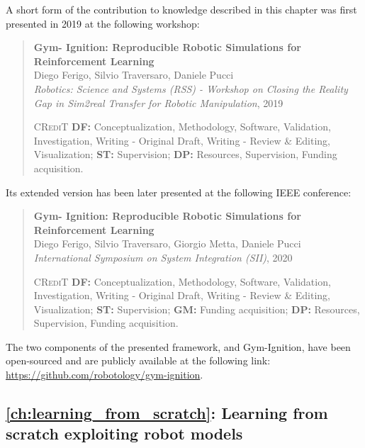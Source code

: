 A short form of the contribution to knowledge described in this chapter was first presented in 2019 at the following workshop:
%
\begin{quote}
    \textbf{Gym-
Ignition: Reproducible Robotic Simulations for Reinforcement
Learning} \\
    Diego Ferigo, Silvio Traversaro, Daniele Pucci \\
    \textit{Robotics: Science and Systems (RSS) - Workshop on
Closing the Reality Gap in Sim2real Transfer for Robotic Manipulation}, 2019

    \vspace{1mm}
    \textsc{CRediT} \hspace{2mm}
    \textbf{DF:} Conceptualization, Methodology, Software, Validation, Investigation, Writing - Original Draft, Writing - Review \& Editing, Visualization;
    \textbf{ST:} Supervision;
    \textbf{DP:} Resources, Supervision, Funding acquisition.
\end{quote}

\noindent
Its extended version has been later presented at the following IEEE conference:
%
\begin{quote}
    \textbf{Gym-
Ignition: Reproducible Robotic Simulations for Reinforcement
Learning} \\
    Diego Ferigo, Silvio Traversaro, Giorgio Metta, Daniele Pucci \\
    \textit{International Symposium on System Integration (SII)}, 2020

    \vspace{1mm}
    \textsc{CRediT} \hspace{2mm}
    \textbf{DF:} Conceptualization, Methodology, Software, Validation, Investigation, Writing - Original Draft, Writing - Review \& Editing, Visualization;
    \textbf{ST:} Supervision;
    \textbf{GM:} Funding acquisition;
    \textbf{DP:} Resources, Supervision, Funding acquisition.
\end{quote}

\noindent
The two components of the presented framework, \scenario and Gym-Ignition, have been open-sourced and are publicly available at the following link: \url{https://github.com/robotology/gym-ignition}.

\subsection{\autoref{ch:learning_from_scratch}: Learning from scratch exploiting robot models}

